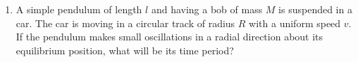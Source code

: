 \begin{enumerate}[label=\thesection.\arabic*,ref=\thesection.\theenumi]
\item A simple pendulum of length $l$ and having a bob of mass $M$ is suspended in a car. The car is moving in a circular track of radius $R$ with a uniform speed $v$. If the pendulum makes small oscillations in a radial direction about its equilibrium position, what will be its time period?
\end{enumerate}
